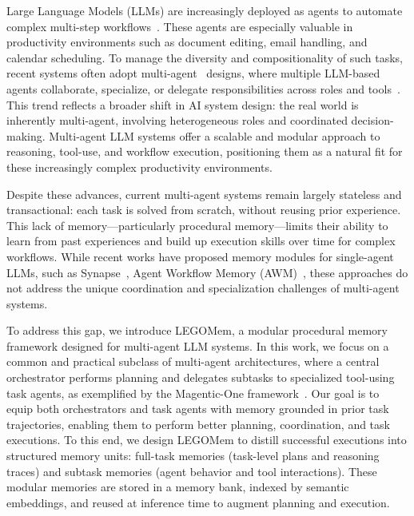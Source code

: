 \documentclass[sigconf]{aamas}
\newcommand{\legomem}{LEGOMem}
\begin{document}
Large Language Models (LLMs) are increasingly deployed as agents to automate complex multi-step workflows~\cite{yao2023react, song2023llm, wang2023plan, kim2024llm, wang2024officebench, xie2024osworld, wang2025odysseybench, zhou2023webarena, mialon2023gaia, cao2024spider2, rana2023sayplan, ahn2022can, wang2024survey, cheng2024exploring}. These agents are especially valuable in productivity environments such as document editing, email handling, and calendar scheduling. To manage the diversity and compositionality of such tasks, recent systems often adopt multi-agent~\cite{stone2000multiagent, 10.5555/1695886} designs, where multiple LLM-based agents collaborate, specialize, or delegate responsibilities across roles and tools~\cite{fourney2024magentic, wu2024autogen, dang2025multi, chen2023agentverse, zhang2024ufo}. This trend reflects a broader shift in AI system design: the real world is inherently multi-agent, involving heterogeneous roles and coordinated decision-making. Multi-agent LLM systems offer a scalable and modular approach to reasoning, tool-use, and workflow execution, positioning them as a natural fit for these increasingly complex productivity environments.


Despite these advances, current multi-agent systems remain largely stateless and transactional: each task is solved from scratch, without reusing prior experience. This lack of memory—particularly procedural memory—limits their ability to learn from past experiences and build up execution skills over time for complex workflows. While recent works have proposed memory modules for single-agent LLMs, such as Synapse~\cite{zheng2023synapse}, Agent Workflow Memory (AWM)~\cite{wangAgentWorkflowMemory2024}, these approaches do not address the unique coordination and specialization challenges of multi-agent systems. 

To address this gap, we introduce \legomem{}, a modular procedural memory framework designed for multi-agent LLM systems. In this work, we focus on a common and practical subclass of multi-agent architectures, where a central orchestrator performs planning and delegates subtasks to specialized tool-using task agents, as exemplified by the Magentic-One framework~\cite{fourney2024magentic, wu2024autogen}. Our goal is to equip both orchestrators and task agents with memory grounded in prior task trajectories, enabling them to perform better planning, coordination, and task executions. 
To this end, we design \legomem{} to distill successful executions into structured memory units: full-task memories (task-level plans and reasoning traces) and subtask memories (agent behavior and tool interactions). These modular memories are stored in a memory bank, indexed by semantic embeddings, and reused at inference time to augment planning and execution.
\end{document}
